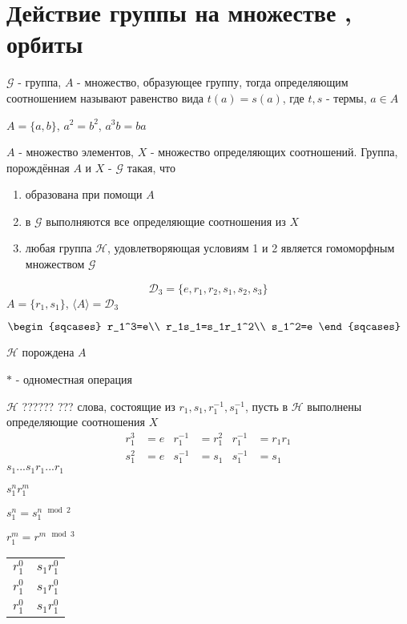 \documentclass[../main/document.tex]{subfiles}
\begin{document}
\section{Действие группы на множестве , орбиты}
\begin{dfn}
$\mathcal{G}$ - группа, $A$ - множество, образующее группу, тогда определяющим соотношением называют равенство вида $t(a)=s(a)$, где $t,s$ - термы, $a\in A$
\end{dfn}

\begin{exm}
$A=\{a,b\}$, $a^2=b^2$, $a^3b=ba$
\end{exm}

\begin{dfn}
$A$ - множество элементов, $X$ - множество определяющих соотношений. Группа, порождённая $A$ и $X$ - $\mathcal{G}$ такая, что
\begin{enumerate}
\item образована при помощи $A$
\item в $\mathcal{G}$ выполняются все определяющие соотношения из $X$
\item любая группа $\mathcal{H}$, удовлетворяющая условиям 1 и 2 является гомоморфным множеством $\mathcal{G}$
\end{enumerate}
\end{dfn}

\begin{exm}
$$\mathcal{D}_3=\{e,r_1,r_2,s_1,s_2,s_3\}$$
$A=\{r_1,s_1\}$, $\langle A\rangle=\mathcal{D}_3$

$
\begin{sqcases}
r_1^3=e\\
r_1s_1=s_1r_1^2\\
s_1^2=e
\end{sqcases}$

$\mathcal{H}$ порождена $A$

$*$ - одноместная операция

$\mathcal{H}$ ?????? ??? слова, состоящие из $r_1,s_1,r_1^{-1},s_1^{-1}$, пусть в $\mathcal{H}$ выполнены определяющие соотношения $X$
\begin{align*}
r_1^3&=e & r_1^{-1}&=r_1^2 & r_1^{-1}&=r_1r_1\\
s_1^2&=e & s_1^{-1}&=s_1 & s_1^{-1}&=s_1
\end{align*}
$s_1...s_1r_1...r_1$

$s_1^nr_1^m$

$s_1^n=s_1^{n\mod 2}$

$r_1^m=r^{m\mod 3}$
\begin{table}[h]
\renewcommand*{\arraystretch}{1.4}
\begin{tabular}{|c c|}

\hline
 $r_1^0$ & $s_1r_1^0$  \\ 
$r_1^0$ & $s_1r_1^0$ \\ 
$r_1^0$ & $s_1r_1^0$  \\ 
\hline
\end{tabular}
\end{table}
\end{exm}
\end{document}
